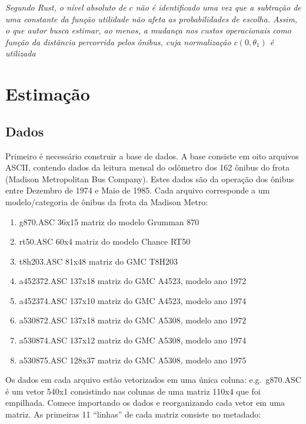 \documentclass[12pt,a4paper]{article}
\providecommand{\tightlist}{%
  \setlength{\itemsep}{0pt}\setlength{\parskip}{0pt}}
\begin{document}
\emph{Segundo Rust, o nível absoluto de \(c\) não é identificado uma vez
que a subtração de uma constante da função utilidade não afeta as
probabilidades de escolha. Assim, o que autor busca estimar, ao menos, a
mudança nos custos operacionais como função da distância percorrida
pelos ônibus, cuja normalização \(c(0,\theta_1)\) é utilizada}

\hypertarget{estimacao}{%
\section{Estimação}\label{estimacao}}

\hypertarget{dados}{%
\subsection{Dados}\label{dados}}

Primeiro é necessário construir a base de dados. A base consiste em oito
arquivos ASCII, contendo dados da leitura mensal do odômetro dos 162
ônibus do frota (Madison Metropolitan Bus Company). Estes dados são da
operação dos ônibus entre Dezembro de 1974 e Maio de 1985. Cada arquivo
corresponde a um modelo/categoria de ônibus da frota da Madison Metro:

\begin{enumerate}
\def\labelenumi{\arabic{enumi}.}
\tightlist
\item
  g870.ASC 36x15 matriz do modelo Grumman 870
\item
  rt50.ASC 60x4 matriz do modelo Chance RT50
\item
  t8h203.ASC 81x48 matriz do GMC T8H203
\item
  a452372.ASC 137x18 matriz do GMC A4523, modelo ano 1972
\item
  a452374.ASC 137x10 matriz do GMC A4523, modelo ano 1974
\item
  a530872.ASC 137x18 matriz do GMC A5308, modelo ano 1972
\item
  a530874.ASC 137x12 matriz do GMC A5308, modelo ano 1974
\item
  a530875.ASC 128x37 matriz do GMC A5308, modelo ano 1975
\end{enumerate}

Os dados em cada arquivo estão vetorizados em uma única coluna:
e.g.~g870.ASC é um vetor 540x1 consistindo nas colunas de uma matriz
110x4 que foi empilhada. Comece importando os dados e reorganizando cada
vetor em uma matriz. As primeiras 11 ``linhas'' de cada matriz consiste
no metadado:
\end{document}
